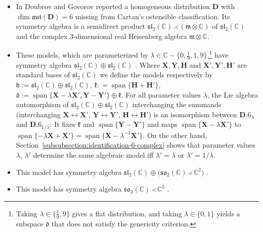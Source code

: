\documentclass[10pt,a4paper]{amsart}
\DeclareMathOperator{\spanOperator}{span}
\newcommand{\Span}[1]{\spanOperator\{{#1}\}}
\newcommand{\bbC}{\mathbb{C}}
\newcommand{\mbD}{\mathbf{D}}
\newcommand{\mbH}{\mathbf{H}}
\newcommand{\mbX}{\mathbf{X}}
\newcommand{\mbY}{\mathbf{Y}}
\newcommand{\mfd} {\mathfrak{d}}
\newcommand{\mfh} {\mathfrak{h}}
\newcommand{\mfk} {\mathfrak{k}}
\newcommand{\mfm} {\mathfrak{m}}
\newcommand{\mfaut}{\mathfrak{aut}}
\newcommand{\mfsl} {\mathfrak{sl}}
\newcommand{\mfso} {\mathfrak{so}}
\numberwithin{equation}{section}
\begin{document}
\begin{itemize}[leftmargin=1.5cm]\itemsep=0pt
\item[\textbf{$\mathbf{N.6}$}] In \cite{DoubrovGovorovCounterexample} Doubrov and Govorov reported a homogeneous distribution $\mbD$ with $\dim \mfaut(\mbD) = 6$ missing from Cartan's ostensible classification. Its symmetry algebra is a semidirect product $\mfsl_2(\bbC) \rightthreetimes (\mfm \otimes \bbC)$ of $\mfsl_2(\bbC)$ and the complex $3$-dimensional real Heisenberg algebra $\mfm \otimes \bbC$.
\item[\textbf{$\mathbf{D.6}_{\lambda}$}] These models, which are parameterized by $\lambda \in \bbC - \{ 0, \frac{1}{9}, 1, 9 \}$,\footnote{Taking $\lambda \in \{\frac{1}{9}, 9\}$ gives a flat distribution, and taking $\lambda \in \{0, 1\}$ yields a subspace $\mfd$ that does not satisfy the genericity criterion.} have symmetry algebra $\mfsl_2(\bbC) \oplus \mfsl_2(\bbC)$ \cite[Section~50]{CartanFiveVariables}. Where $\mbX, \mbY, \mbH$ and $\mbX', \mbY', \mbH'$ are standard bases of $\mfsl_2(\bbC)$ we define the models respectively by $\mfh := \mfsl_2(\bbC) \oplus \mfsl_2(\bbC)$, $\mfk: = \Span{\mbH + \mbH'}$, $\mfd := \Span{\mbX - \lambda \mbX', \mbY - \mbY'} \oplus \mfk$. For all parameter values $\lambda$, the Lie algebra automorphism of $\mfsl_2(\bbC) \oplus \mfsl_2(\bbC)$ interchanging the summands (interchanging $\mbX \leftrightarrow \mbX'$, $\mbY \leftrightarrow \mbY'$, $\mbH \leftrightarrow \mbH'$) is an isomorphism between $\mathbf{D.6}_{\lambda}$ and $\mathbf{D.6}_{1 / \lambda}$: It fixes $\mfk$ and $\Span{\mbY - \mbY'}$ and maps $\Span{\mbX - \lambda \mbX'}$ to $\Span{-\lambda \mbX + \mbX'} = \Span{\mbX - \lambda^{-1} \mbX'}$. On the other hand, Section~\ref{subsubsection:identification-6-complex} shows that parameter values $\lambda$, $\lambda'$ determine the same algebraic model iff $\lambda' = \lambda$ or $\lambda' = 1 / \lambda$.
\item[\textbf{$\mathbf{D.6}_{\infty}$}] This model has symmetry algebra $\mfsl_2(\bbC) \oplus \big(\mfso_2(\bbC) \rightthreetimes \bbC^2\big)$ \cite[Section~51]{CartanFiveVariables}.
\item[\textbf{$\mathbf{D.6}_{\ast}$}] This model has symmetry algebra $\mfso_3(\bbC) \rightthreetimes \bbC^3$ \cite[Section~52]{CartanFiveVariables}.
\end{itemize}
\end{document}
